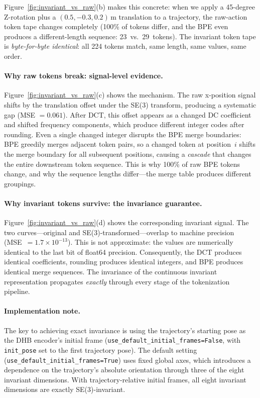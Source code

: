 \documentclass[11pt]{article}
\begin{document}
Figure~\ref{fig:invariant_vs_raw}(b) makes this concrete: when we apply a 45-degree Z-rotation plus a $(0.5, -0.3, 0.2)$\,m translation to a trajectory, the raw-action token tape changes completely (100\% of tokens differ, and the BPE even produces a different-length sequence: 23~vs.~29~tokens). The invariant token tape is \emph{byte-for-byte identical}: all 224 tokens match, same length, same values, same order.

\paragraph{Why raw tokens break: signal-level evidence.}
Figure~\ref{fig:invariant_vs_raw}(c) shows the mechanism. The raw x-position signal shifts by the translation offset under the SE(3) transform, producing a systematic gap (MSE $= 0.061$). After DCT, this offset appears as a changed DC coefficient and shifted frequency components, which produce different integer codes after rounding. Even a single changed integer disrupts the BPE merge boundaries: BPE greedily merges adjacent token pairs, so a changed token at position~$i$ shifts the merge boundary for all subsequent positions, causing a \emph{cascade} that changes the entire downstream token sequence. This is why 100\% of raw BPE tokens change, and why the sequence lengths differ---the merge table produces different groupings.

\paragraph{Why invariant tokens survive: the invariance guarantee.}
Figure~\ref{fig:invariant_vs_raw}(d) shows the corresponding invariant signal. The two curves---original and SE(3)-transformed---overlap to machine precision (MSE~$= 1.7\!\times\!10^{-13}$). This is not approximate: the values are numerically identical to the last bit of float64 precision. Consequently, the DCT produces identical coefficients, rounding produces identical integers, and BPE produces identical merge sequences. The invariance of the continuous invariant representation propagates \emph{exactly} through every stage of the tokenization pipeline.

\paragraph{Implementation note.}
The key to achieving exact invariance is using the trajectory's starting pose as the DHB encoder's initial frame (\texttt{use\_default\_initial\_frames=False}, with \texttt{init\_pose} set to the first trajectory pose). The default setting (\texttt{use\_default\_initial\_frames=True}) uses fixed global axes, which introduces a dependence on the trajectory's absolute orientation through three of the eight invariant dimensions. With trajectory-relative initial frames, all eight invariant dimensions are exactly SE(3)-invariant.
\end{document}

